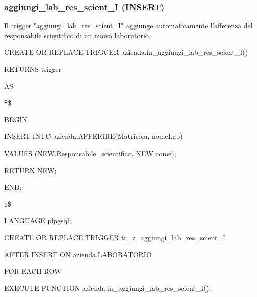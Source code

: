 \newpage
    
        \subsubsection{aggiungi\_lab\_res\_scient\_I (INSERT)}
        Il trigger "aggiungi\_lab\_res\_scient\_I" aggiunge automaticamente l'afferenza del responsabile scientifico di un nuovo laboratorio.
        \ttfamily
            \begin{flushleft}
                \begin{description}
                    \item CREATE OR REPLACE TRIGGER azienda.fn\_aggiungi\_lab\_res\_scient\_I()  
                    \item RETURNS trigger
                    \item AS
                    \item \$\$
                    \item BEGIN 
                    \begin{description}
                        \item INSERT INTO azienda.AFFERIRE(Matricola, nomeLab)
                        \item VALUES (NEW.Responsabile\_scientifico, NEW.nome);
                                                            
                        \vspace{0.5cm}

                        \item RETURN NEW;
                    \end{description}
                    \item END;
                    \item \$\$
                    \item LANGUAGE plpgsql;
                \end{description}
            \end{flushleft}
        \normalfont

        \ttfamily
            \begin{flushleft}
                \begin{description}
                    \item CREATE OR REPLACE TRIGGER tr\_z\_aggiungi\_lab\_res\_scient\_I
                    \item AFTER INSERT ON azienda.LABORATORIO
                    \item FOR EACH ROW
                    \item EXECUTE FUNCTION azienda.fn\_aggiungi\_lab\_res\_scient\_I();
                \end{description}
            \end{flushleft}
        \normalfont

